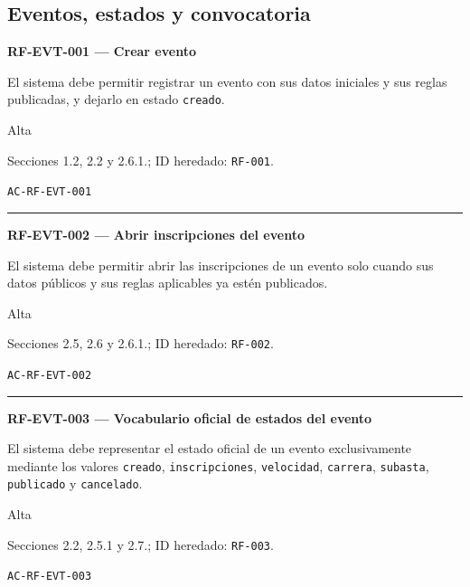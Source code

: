 \documentclass[10pt,letterpaper]{article}
\begin{document}
\subsection{Eventos, estados y convocatoria}
\noindent\textbf{RF-EVT-001 --- Crear evento}\par
\begin{description}[style=nextline,leftmargin=3.15cm,labelwidth=2.8cm,font=\normalfont\bfseries]
\item[Obligación] El sistema debe permitir registrar un evento con sus datos iniciales y sus reglas publicadas, y dejarlo en estado \texttt{creado}.
\item[Prioridad] Alta
\item[Procedencia] Secciones 1.2, 2.2 y 2.6.1.; ID heredado: \texttt{RF-001}.
\item[Verificación] \texttt{AC-RF-EVT-001}
\end{description}
\vspace{0.25em}\hrule\vspace{0.65em}
\noindent\textbf{RF-EVT-002 --- Abrir inscripciones del evento}\par
\begin{description}[style=nextline,leftmargin=3.15cm,labelwidth=2.8cm,font=\normalfont\bfseries]
\item[Obligación] El sistema debe permitir abrir las inscripciones de un evento solo cuando sus datos públicos y sus reglas aplicables ya estén publicados.
\item[Prioridad] Alta
\item[Procedencia] Secciones 2.5, 2.6 y 2.6.1.; ID heredado: \texttt{RF-002}.
\item[Verificación] \texttt{AC-RF-EVT-002}
\end{description}
\vspace{0.25em}\hrule\vspace{0.65em}
\noindent\textbf{RF-EVT-003 --- Vocabulario oficial de estados del evento}\par
\begin{description}[style=nextline,leftmargin=3.15cm,labelwidth=2.8cm,font=\normalfont\bfseries]
\item[Obligación] El sistema debe representar el estado oficial de un evento exclusivamente mediante los valores \texttt{creado}, \texttt{inscripciones}, \texttt{velocidad}, \texttt{carrera}, \texttt{subasta}, \texttt{publicado} y \texttt{cancelado}.
\item[Prioridad] Alta
\item[Procedencia] Secciones 2.2, 2.5.1 y 2.7.; ID heredado: \texttt{RF-003}.
\item[Verificación] \texttt{AC-RF-EVT-003}
\end{description}
\end{document}
